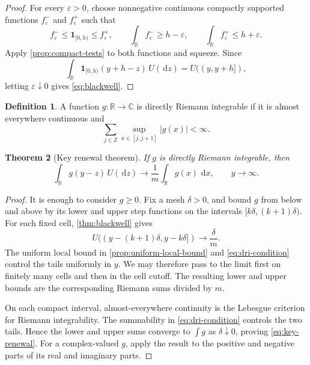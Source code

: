 \documentclass[10pt,reqno,a4paper]{amsart}
\numberwithin{equation}{section}
\theoremstyle{plain}
\newtheorem{theorem}{Theorem}[section]
\theoremstyle{definition}
\newtheorem{definition}[theorem]{Definition}
\theoremstyle{remark}
\newcommand{\R}{\mathbb{R}}
\newcommand{\C}{\mathbb{C}}
\newcommand{\1}{\mathbf{1}}
\newcommand{\de}{\,\mathrm{d}}
\newcommand{\abs}[1]{\left|#1\right|}
\begin{document}
\begin{proof}
  For every \(\varepsilon>0\), choose nonnegative continuous compactly
  supported functions \(f_\varepsilon^-\) and \(f_\varepsilon^+\) such that
  \begin{equation*}
    f_\varepsilon^-
    \leq\1_{[0,h)}
    \leq f_\varepsilon^+,
    \qquad
    \int_\R f_\varepsilon^-\geq h-\varepsilon,
    \qquad
    \int_\R f_\varepsilon^+\leq h+\varepsilon.
  \end{equation*}
  Apply \cref{prop:compact-tests} to both functions and squeeze.  Since
  \begin{equation*}
    \int_\R \1_{[0,h)}(y+h-z)\,U(\de z)=U((y,y+h]),
  \end{equation*}
  letting \(\varepsilon\downarrow0\) gives \cref{eq:blackwell}.
\end{proof}

\begin{definition}\label{def:directly-riemann-integrable}
  A function \(g:\R\to\C\) is directly Riemann integrable if it is almost
  everywhere continuous and
  \begin{equation}\label{eq:dri-condition}
    \sum_{j\in\mathbb Z}
    \sup_{x\in[j,j+1]}\abs{g(x)}<\infty.
  \end{equation}
\end{definition}

\begin{theorem}[Key renewal theorem]\label{thm:key-renewal}
  If \(g\) is directly Riemann integrable, then
  \begin{equation}\label{eq:key-renewal}
    \int_\R g(y-z)\,U(\de z)
    \longrightarrow
    \frac{1}{m}\int_\R g(x)\,\de x,
    \qquad y\to\infty.
  \end{equation}
\end{theorem}

\begin{proof}
  It is enough to consider \(g\geq0\).  Fix a mesh \(\delta>0\), and bound
  \(g\) from below and above by its lower and upper step functions on the
  intervals \([k\delta,(k+1)\delta)\).  For each fixed cell,
  \cref{thm:blackwell} gives
  \begin{equation*}
    U((y-(k+1)\delta,y-k\delta])
    \longrightarrow
    \frac{\delta}{m}.
  \end{equation*}
  The uniform local bound in \cref{prop:uniform-local-bound} and
  \cref{eq:dri-condition} control the tails uniformly in \(y\).  We may
  therefore pass to the limit first on finitely many cells and then in the
  cell cutoff.  The resulting lower and upper bounds are the corresponding
  Riemann sums divided by \(m\).

  On each compact interval, almost-everywhere continuity is the Lebesgue
  criterion for Riemann integrability.  The summability in
  \cref{eq:dri-condition} controls the two tails.  Hence the lower and upper
  sums converge to \(\int g\) as \(\delta\downarrow0\), proving
  \cref{eq:key-renewal}.  For a complex-valued \(g\), apply the result to the
  positive and negative parts of its real and imaginary parts.
\end{proof}
\end{document}
